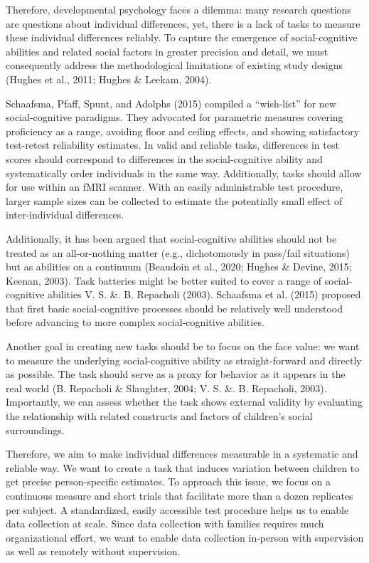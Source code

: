 \documentclass[
  man,floatsintext]{apa6}
\begin{document}
Therefore, developmental psychology faces a dilemma: many research questions are questions about individual differences, yet, there is a lack of tasks to measure these individual differences reliably.
To capture the emergence of social-cognitive abilities and related social factors in greater precision and detail, we must consequently address the methodological limitations of existing study designs (Hughes et al., 2011; Hughes \& Leekam, 2004).

Schaafsma, Pfaff, Spunt, and Adolphs (2015) compiled a ``wish-list'' for new social-cognitive paradigms. They advocated for parametric measures covering proficiency as a range, avoiding floor and ceiling effects, and showing satisfactory test-retest reliability estimates.
In valid and reliable tasks, differences in test scores should correspond to differences in the social-cognitive ability and systematically order individuals in the same way.
Additionally, tasks should allow for use within an fMRI scanner.
With an easily administrable test procedure, larger sample sizes can be collected to estimate the potentially small effect of inter-individual differences.

Additionally, it has been argued that social-cognitive abilities should not be treated as an all-or-nothing matter (e.g., dichotomously in pass/fail situations) but as abilities on a continuum (Beaudoin et al., 2020; Hughes \& Devine, 2015; Keenan, 2003).
Task batteries might be better suited to cover a range of social-cognitive abilities V. S. \&. B. Repacholi (2003).
Schaafsma et al. (2015) proposed that first basic social-cognitive processes should be relatively well understood before advancing to more complex social-cognitive abilities.

Another goal in creating new tasks should be to focus on the face value:
we want to measure the underlying social-cognitive ability as straight-forward and directly as possible.
The task should serve as a proxy for behavior as it appears in the real world (B. Repacholi \& Slaughter, 2004; V. S. \&. B. Repacholi, 2003).
Importantly, we can assess whether the task shows external validity by evaluating the relationship with related constructs and factors of children's social surroundings.

Therefore, we aim to make individual differences measurable in a systematic and reliable way.
We want to create a task that induces variation between children to get precise person-specific estimates.
To approach this issue, we focus on a continuous measure and short trials that facilitate more than a dozen replicates per subject.
A standardized, easily accessible test procedure helps us to enable data collection at scale.
Since data collection with families requires much organizational effort, we want to enable data collection in-person with supervision as well as remotely without supervision.
\end{document}
